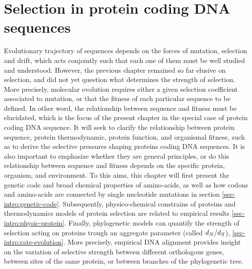 \chapter{Selection in protein coding {DNA} sequences}
{
	\hypersetup{linkcolor=GREYDARK}
	\minitoc
}
\label{sec:selection}

Evolutionary trajectory of sequences depends on the forces of mutation, selection and drift, which acts conjointly such that each one of them must be well studied and understood.
However, the previous chapter remained so far elusive on selection, and did not yet question what determines the strength of selection.
More precisely, molecular evolution requires either a given selection coefficient associated to mutation, or that the fitness of each particular sequence to be defined.
In other word, the relationship between sequence and fitness must be elucidated, which is the focus of the present chapter in the special case of protein coding \acrshort{DNA} sequence.
It will seek to clarify the relationship between protein sequence, protein thermodynamic, protein function, and organismal fitness, such as to derive the selective pressures shaping proteins coding \acrshort{DNA} sequences.
It is also important to emphasize whether they are general principles, or do this relationship between sequence and fitness depends on the specific protein, organism, and environment.
To this aims, this chapter will first present the genetic code and broad chemical properties of amino-acids, as well as how \glspl{codon} and amino-acids are connected by single nucleotide mutations in section \ref{sec-intro:genetic-code}.
Subsequently, physico-chemical constrains of proteins and thermodynamics models of protein selection are related to empirical results \ref{sec-intro:physic-protein}.
Finally, phylogenetic models can quantify the strength of selection acting on proteins trough an aggregate parameter (called $d_N / d_S$), \ref{sec-intro:rate-evolution}.
More precisely, empirical \acrshort{DNA} alignment provides insight on the variation of selective strength between different orthologous genes, between sites of the same protein, or between branches of the phylogenetic tree.

